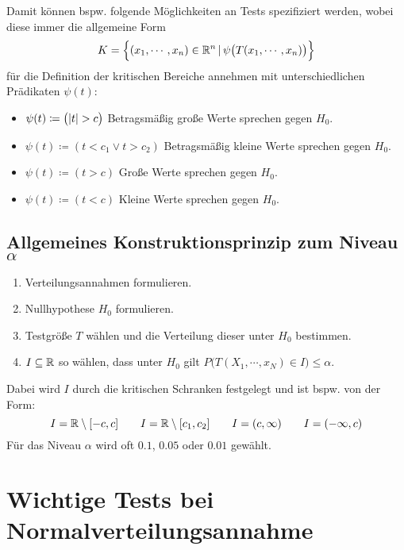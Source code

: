 			Damit können bspw. folgende Möglichkeiten an Tests spezifiziert werden, wobei diese immer die allgemeine Form \[ K = \Big\{ (x_1, \cdots, x_n) \in \mathbb{R}^n \,\vert\, \psi\big(T(x_1, \cdots, x_n)\big) \Big\} \] für die Definition der kritischen Bereiche annehmen mit unterschiedlichen Prädikaten \( \psi(t) \):
			\begin{itemize}
				\item \( \psi(t) \coloneqq \big(\abs{t} > c\big) \)  \tabto{4.5cm} Betragsmäßig große Werte sprechen gegen \(H_0\).
				\item \( \psi(t) \coloneqq (t < c_1 \lor t > c_2) \) \tabto{4.5cm} Betragsmäßig kleine Werte sprechen gegen \(H_0\).
				\item \( \psi(t) \coloneqq (t > c) \)                \tabto{4.5cm} Große Werte sprechen gegen \(H_0\).
				\item \( \psi(t) \coloneqq (t < c) \)                \tabto{4.5cm} Kleine Werte sprechen gegen \(H_0\).
			\end{itemize}

		\subsection{Allgemeines Konstruktionsprinzip zum Niveau \(\alpha\)}
			\begin{enumerate}
				\item Verteilungsannahmen formulieren.
				\item Nullhypothese \(H_0\) formulieren.
				\item Testgröße \(T\) wählen und die Verteilung dieser unter \(H_0\) bestimmen.
				\item \(I \subseteq \mathbb{R} \) so wählen, dass unter \(H_0\) gilt \( P\big(T(X_1, \cdots, x_N) \in I\big) \leq \alpha \).
			\end{enumerate}
			Dabei wird \(I\) durch die kritischen Schranken festgelegt und ist bspw. von der Form:
			\begin{equation*}
				I = \mathbb{R} \setminus [-c, c] \qquad I = \mathbb{R} \setminus [c_1, c_2] \qquad I = (c, \infty) \qquad I = (-\infty, c)
			\end{equation*}
			Für das Niveau \( \alpha \) wird oft \( 0.1\), \(0.05\) oder \(0.01 \) gewählt.

	\section{Wichtige Tests bei Normalverteilungsannahme}
